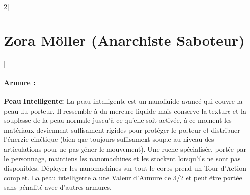 \documentclass[a4paper,9pt]{article}
\begin{document}
\begin{multicols}{2}[\section*{Zora Möller (Anarchiste Saboteur)}]
   \paragraph{Armure :}
   \textbf{Peau Intelligente:} La peau intelligente est un nanofluide avancé qui
couvre la peau du porteur. Il ressemble à du mercure liquide mais conserve la
texture et la souplesse de la peau normale jusqu'à ce qu'elle soit activée, à
ce moment les matériaux deviennent suffisament rigides pour protéger le porteur
et distribuer l'énergie cinétique (bien que toujours suffisament souple au
niveau des articulations pour ne pas géner le mouvement). Une ruche
spécialisée, portée par le personnage, maintiens les nanomachines et les
stockent lorsqu'ils ne sont pas disponibles. Déployer les nanomachines sur tout
le corps prend un Tour d'Action complet. La peau intelligente a une Valeur
d'Armure de 3/2 et peut être portée sans pénalité avec d'autres armures.

\end{multicols}
\end{document}

